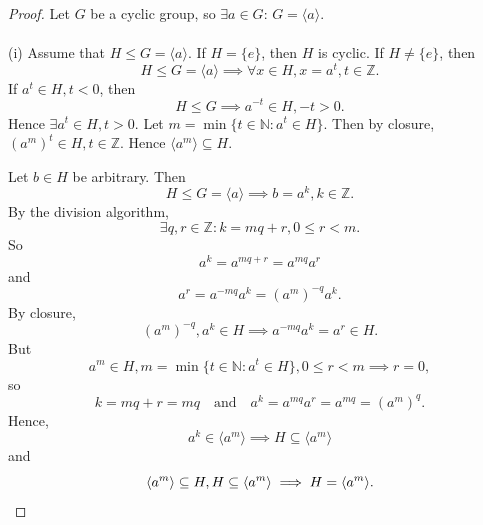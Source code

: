 \documentclass{article}
\theoremstyle{definition}
\begin{document}
\begin{proof}
    Let $G$ be a cyclic group, so $\exists a \in G$: $G=\langle a \rangle$.
    \\ \\
    (i) Assume that $H \leq G = \langle a \rangle$. If $H=\{e\}$, then $H$ is cyclic. If $H \neq \{e\}$, then
    \begin{equation*}
        H \leq G = \langle a \rangle \implies \forall x \in H, x = a^t, t \in \mathbb{Z}.
    \end{equation*}
    If $a^t \in H, t<0$, then
    \begin{equation*}
        H \leq G \implies a^{-t} \in H, -t>0.
    \end{equation*}
    Hence $\exists a^t \in H, t > 0$. Let $m = \min\{t \in\mathbb{N}:a^t \in H\}$. Then by closure, $(a^m)^t \in H, t \in \mathbb{Z}$. Hence $\langle a^m \rangle \subseteq H$.
    
    Let $b \in H$ be arbitrary. Then
    \begin{equation*}
        H \leq G = \langle a \rangle \implies b = a^k, k \in \mathbb{Z}.
    \end{equation*}
    By the division algorithm,
    \begin{equation*}
        \exists q,r \in \mathbb{Z}: k=mq+r, 0 \leq r < m.
    \end{equation*}
    So
    \begin{equation*}
        a^k = a^{mq+r} = a^{mq}a^r
    \end{equation*}
    and
    \begin{equation*}
        a^r = a^{-mq}a^k = (a^m)^{-q}a^k.
    \end{equation*}
    By closure,
    \begin{equation*}
        (a^m)^{-q},a^k \in H \implies a^{-mq}a^k=a^r \in H.
    \end{equation*}
    But 
    \begin{equation*}
        a^m \in H, m = \min\{t \in\mathbb{N}:a^t \in H\}, 0 \leq r < m \implies r=0,
    \end{equation*}
    so
    \begin{equation*}
        k = mq+r=mq \quad \text{and} \quad a^k = a^{mq}a^r = a^{mq} = (a^m)^q.
    \end{equation*}
    Hence,
    \begin{equation*}
        a^k \in \langle a^m \rangle \implies H \subseteq \langle a^m \rangle
    \end{equation*}
    and
    \begin{equation*}
        \langle a^m \rangle \subseteq H, H \subseteq \langle a^m \rangle \implies H = \langle a^m \rangle. \\
    \end{equation*}
    

\end{proof}
\end{document}
